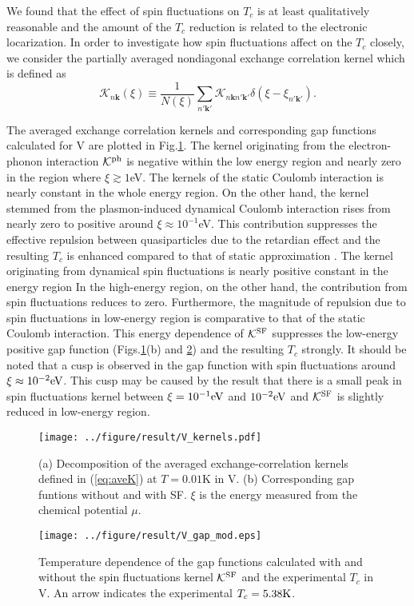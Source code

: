 We found that the effect of spin fluctuations on $T_c$ is at least qualitatively reasonable and 
the amount of the $T_c$ reduction is related to the electronic locarization.
In order to investigate how spin fluctuations affect on the $T_c$ closely, we 
consider the partially averaged nondiagonal exchange correlation kernel which is defined as
%
\begin{equation}
	\mathcal K_{n\bm k}(\xi) \equiv \frac{1}{N(\xi)}
	\sum_{n'\bm k'} \mathcal K_{n\bm k n'\bm k'}\delta(\xi - \xi_{n'\bm k'}).
	\label{eq:aveK}
\end{equation}
%

The averaged exchange correlation kernels and corresponding gap functions calculated for V 
are plotted in Fig.\ref{fig:Vaveker}. The kernel originating from the electron-phonon interaction
$\mathcal K^{\rm ph}$ is negative within the low energy region and nearly zero in the region 
where $\xi \gtrsim 1$eV. The kernels of the static Coulomb interaction is nearly constant in the
whole energy region. On the other hand, the kernel stemmed from the plasmon-induced dynamical
Coulomb interaction rises from nearly zero to positive around $\xi \approx 10^{-1}$eV.
This contribution suppresses the effective repulsion between quasiparticles due to the 
retardian effect and the resulting $T_c$ is enhanced compared to that of static approximation
\cite{RA2013}.
The kernel originating from dynamical spin fluctuations is nearly positive constant in the energy region 
In the high-energy region, on the other hand, the contribution from spin fluctuations reduces to zero. 
Furthermore, the magnitude of repulsion due to spin fluctuations in low-energy region is comparative 
to that of the static Coulomb interaction. This energy dependence of
$\mathcal K^{\rm SF}$ suppresses the low-energy positive gap function (Figs.\ref{fig:Vaveker}(b)
and \ref{fig:VgapT}) and
the resulting $T_c$ strongly.
It should be noted that a cusp is observed in the gap function with spin fluctuations 
around $\xi \approx 10^{-2}{\rm eV}$. This cusp may be caused by the result that there is a small
peak in spin fluctuations kernel between $\xi = 10^{-1}{\rm eV}$ and $10^{-2}{\rm eV}$ and
$\mathcal K^{\rm SF}$ is slightly reduced in low-energy region.

%
\begin{figure}[h]
	\centering
	\texttt{[image: ../figure/result/V\_kernels.pdf]}
	\caption{(a) Decomposition of the averaged exchange-correlation kernels defined in 
		(\ref{eq:aveK}) at $T=0.01$K in V. (b) Corresponding gap funtions without 
	and with SF. $\xi$ is the energy measured from the chemical potential $\mu$.}
	\label{fig:Vaveker}
\end{figure}
%
\begin{figure}[h]
	\centering
	\texttt{[image: ../figure/result/V\_gap\_mod.eps]}
	\caption{Temperature dependence of the gap functions calculated with and without 
		the spin fluctuations kernel $\mathcal K^{\rm SF}$ and the experimental $T_c$ in V.
		An arrow indicates the experimental $T_c = 5.38{\rm K}$.}
	\label{fig:VgapT}
\end{figure}
%

